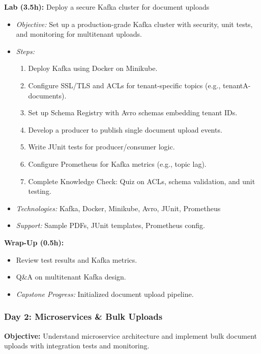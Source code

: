 \documentclass[11pt]{article}
\begin{document}
\textbf{Lab (3.5h):} Deploy a secure Kafka cluster for document uploads
\begin{itemize}
    \item \textit{Objective:} Set up a production-grade Kafka cluster with security, unit tests, and monitoring for multitenant uploads.
    \item \textit{Steps:}
        \begin{enumerate}
            \item Deploy Kafka using Docker on Minikube.
            \item Configure SSL/TLS and ACLs for tenant-specific topics (e.g., tenantA-documents).
            \item Set up Schema Registry with Avro schemas embedding tenant IDs.
            \item Develop a producer to publish single document upload events.
            \item Write JUnit tests for producer/consumer logic.
            \item Configure Prometheus for Kafka metrics (e.g., topic lag).
            \item Complete Knowledge Check: Quiz on ACLs, schema validation, and unit testing.
        \end{enumerate}
    \item \textit{Technologies:} Kafka, Docker, Minikube, Avro, JUnit, Prometheus
    \item \textit{Support:} Sample PDFs, JUnit templates, Prometheus config.
\end{itemize}

\textbf{Wrap-Up (0.5h):}
\begin{itemize}
    \item Review test results and Kafka metrics.
    \item Q\&A on multitenant Kafka design.
    \item \textit{Capstone Progress:} Initialized document upload pipeline.
\end{itemize}

\subsubsection{Day 2: Microservices \& Bulk Uploads}
\textbf{Objective:} Understand microservice architecture and implement bulk document uploads with integration tests and monitoring.
\end{document}

